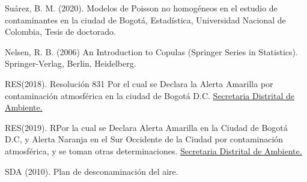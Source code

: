 \begin{thebibliography}{X}

 Suárez, B. M. (2020). Modelos de Poisson no homogéneos en el estudio de contaminantes en la ciudad de Bogotá, Estadística, Universidad Nacional de Colombia, Tesis de doctorado.

 Nelsen, R. B. (2006) An Introduction to Copulas (Springer Series in Statistics). Springer-Verlag, Berlin, Heidelberg.  

 RES(2018). Resolución 831 Por el cual se Declara la Alerta Amarilla por contaminación atmosférica en la ciudad de Bogotá D.C. \underline{Secretaria Distrital de Ambiente.} 

 RES(2019). RPor la cual se Declara Alerta Amarilla en la Ciudad de Bogotá D.C, y Alerta Naranja en el Sur Occidente de la Ciudad por contaminación atmosférica, y se toman otras determinaciones. \underline{Secretaria Distrital de Ambiente.} 

 SDA (2010). Plan de desconaminación del aire. 


\end{thebibliography}



